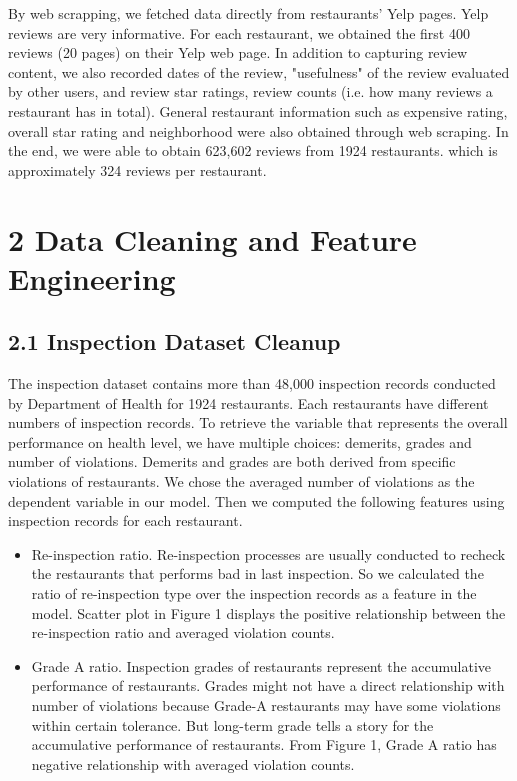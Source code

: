 \documentclass[letterpaper, 11 pt, conference]{ieeeconf}
\begin{document}
By web scrapping, we fetched data directly from restaurants' Yelp pages. Yelp reviews are very informative. For each restaurant, we obtained the first 400 reviews (20 pages) on their Yelp web page. In addition to capturing review content, we also recorded dates of the review, "usefulness" of the review evaluated by other users, and review star ratings, review counts (i.e. how many reviews a restaurant has in total). General restaurant information such as expensive rating, overall star rating and neighborhood were also obtained through web scraping. In the end, we were able to obtain 623,602 reviews from 1924 restaurants. which is approximately 324 reviews per restaurant. 


\section*{2 Data Cleaning and Feature Engineering}

\subsection*{2.1 Inspection Dataset Cleanup}

The inspection dataset contains more than 48,000 inspection records conducted by Department of Health for 1924 restaurants. Each restaurants have different numbers of inspection records. To retrieve the variable that represents the overall performance on health level, we have multiple choices: demerits, grades and number of violations. Demerits and grades are both derived from specific violations of restaurants. We chose the averaged number of violations as the dependent variable in our model. Then we computed the following features using inspection records for each restaurant.

\begin{itemize}
\item Re-inspection ratio. Re-inspection processes are usually conducted to recheck the restaurants that performs bad in last inspection. So we calculated the ratio of re-inspection type over the inspection records as a feature in the model. Scatter plot in Figure 1 displays the positive relationship between the re-inspection ratio and averaged violation counts.
\item Grade A ratio. Inspection grades of restaurants represent the accumulative performance of restaurants. Grades might not have a direct relationship with number of violations because Grade-A restaurants may have some violations within certain tolerance. But long-term grade tells a story for the accumulative performance of restaurants. From Figure 1, Grade A ratio has negative relationship with averaged violation counts. 
\end{itemize}
\end{document}
